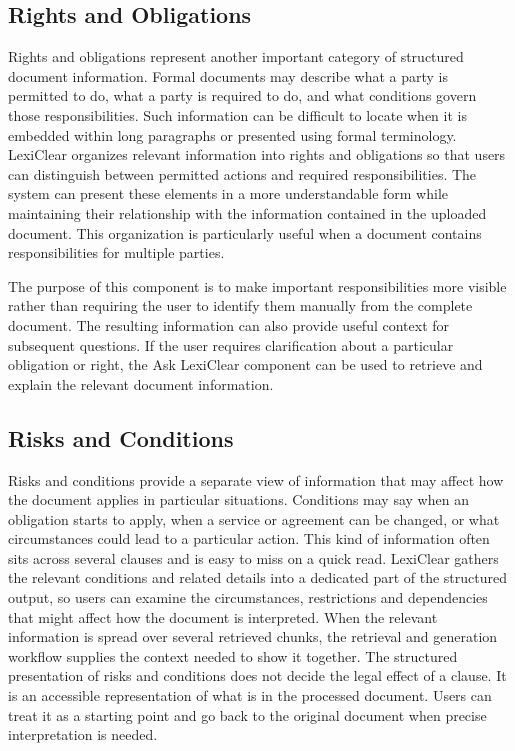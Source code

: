 \documentclass[12pt,a4paper,oneside]{report}
\begin{document}
\subsection{Rights and Obligations}

Rights and obligations represent another important category of structured document information. Formal documents may describe what a party is permitted to do, what a party is required to do, and what conditions govern those responsibilities. Such information can be difficult to locate when it is embedded within long paragraphs or presented using formal terminology. LexiClear organizes relevant information into rights and obligations so that users can distinguish between permitted actions and required responsibilities. The system can present these elements in a more understandable form while maintaining their relationship with the information contained in the uploaded document. This organization is particularly useful when a document contains responsibilities for multiple parties.

The purpose of this component is to make important responsibilities more visible rather than requiring the user to identify them manually from the complete document. The resulting information can also provide useful context for subsequent questions. If the user requires clarification about a particular obligation or right, the Ask LexiClear component can be used to retrieve and explain the relevant document information.

\subsection{Risks and Conditions}

Risks and conditions provide a separate view of information that may affect how the document applies in particular situations. Conditions may say when an obligation starts to apply, when a service or agreement can be changed, or what circumstances could lead to a particular action. This kind of information often sits across several clauses and is easy to miss on a quick read. LexiClear gathers the relevant conditions and related details into a dedicated part of the structured output, so users can examine the circumstances, restrictions and dependencies that might affect how the document is interpreted. When the relevant information is spread over several retrieved chunks, the retrieval and generation workflow supplies the context needed to show it together. The structured presentation of risks and conditions does not decide the legal effect of a clause. It is an accessible representation of what is in the processed document. Users can treat it as a starting point and go back to the original document when precise interpretation is needed.
\end{document}
